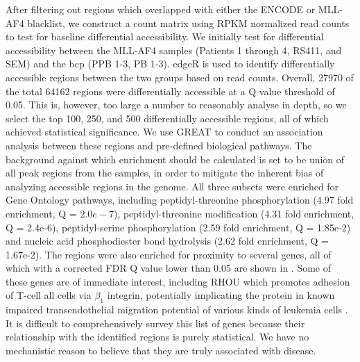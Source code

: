 After filtering out regions which overlapped with either the ENCODE or MLL-AF4 blacklist, we construct a count matrix using RPKM normalized read counts to test for baseline differential accessibility. We initially test for differential accessibility between the MLL-AF4 samples (Patients 1 through 4, RS411, and SEM) and the \gls{bcp} (PPB 1-3, PB 1-3). edgeR is used to identify differentially accessible regions between the two groups based on read counts. Overall, 27970 of the total 64162 regions were differentially accessible at a Q value threshold of 0.05. This is, however, too large a number to reasonably analyse in depth, so we select the top 100, 250, and 500 differentially accessible regions, all of which achieved statistical significance. We use GREAT to conduct an association analysis between these regions and pre-defined biological pathways. The background against which enrichment should be calculated is set to be union of all peak regions from the samples, in order to mitigate the inherent bias of analyzing accessible regions in the genome. All three subsets were enriched for Gene Ontology pathways, including peptidyl-threonine phosphorylation (4.97 fold enrichment, Q = $2.0e-7$), peptidyl-threonine modification (4.31 fold enrichment, Q = 2.4e-6), peptidyl-serine phosphorylation (2.59 fold enrichment, Q = 1.85e-2) and nucleic acid phosphodiester bond hydrolysis (2.62 fold enrichment, Q = 1.67e-2). The regions were also enriched for proximity to several genes, all of which with a corrected FDR Q value lower than 0.05 are shown in .  Some of these genes are of immediate interest, including RHOU which promotes adhesion of T-cell \gls{all} cells via $\beta_1$ integrin, potentially implicating the protein in known impaired transendothelial migration potential of various kinds of leukemia cells \cite{Trinidad2009, Infante2013}. It is difficult to comprehensively survey this list of genes because their relationship with the identified regions is purely statistical. We have no mechanistic reason to believe that they are truly associated with disease. 

